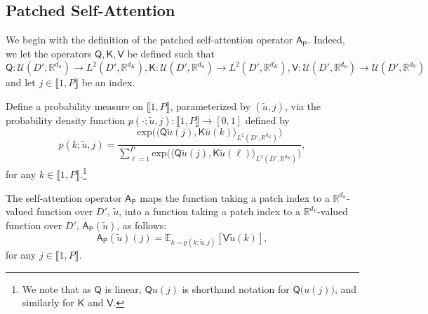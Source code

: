 \documentclass[twoside]{article}
\newcommand{\1}{\mathbbm{1}}
\newcommand{\R}{\mathbbm{R}}
\newcommand{\cU}{\mathcal{U}}
\newcommand{\sAp}{\mathsf{A}_{\mathsf{P}}}
\newcommand{\sQ}{\mathsf{Q}}
\newcommand{\sK}{\mathsf{K}}
\newcommand{\sV}{\mathsf{V}}
\newcommand{\range}[2]{\llbracket #1, #2 \rrbracket}
\providecommand{\mathbbm}{\mathbb} %
\newcommand{\E}{\mathbb{E}}
\begin{document}
\subsection{Patched Self-Attention}
\label{subsec:patch-self-attention}

We begin with the definition of the patched self-attention operator $\sAp$. Indeed, we let the operators $\sQ,\sK,\sV$ be defined such that $\sQ:\cU(D' ,\mathbb{R}^{d_u})\to L^2(D' ,\mathbb{R}^{d_K}), \sK:\cU(D' ,\mathbb{R}^{d_u})\to L^2(D' ,\mathbb{R}^{d_K}), \sV: \cU(D' ,\mathbb{R}^{d_u})\to \cU(D' ,\mathbb{R}^{d_V}) $ and let $j \in \range{1}{P}$ be an index.

\begin{definition}
\label{def:patch_attention_p}
Define a probability measure on $\range{1}{P}$, parameterized by $(\widetilde{u},j)$, via the probability density function $p(\cdot;\widetilde{u},j): \range{1}{P} \to [0,1]$ defined by
\[p(k; \widetilde{u}, j) = \frac{\mathrm{exp} \Big ( \big\langle \sQ \widetilde{u}(j), \sK \widetilde{u}(k) \big\rangle_{L^2(D' ,\mathbb{R}^{d_K})} \Big )}{\sum_{\ell=1}^P \mathrm{exp} \Big ( \big\langle \sQ \widetilde{u}(j), \sK \widetilde{u}(\ell) \big\rangle_{L^2(D' ,\mathbb{R}^{d_K})} \Big )},\]
for any $k \in \range{1}{P}$.\footnote{We note that as $\sQ$ is linear, $\sQ u(j)$ is shorthand notation for $\sQ\bigl(u(j) \bigr)$, and similarly for $\sK$ and $\sV$.}
\end{definition}

\begin{definition}
\label{def:patch_attention}
The self-attention operator $\sAp$ maps the function taking a patch index to a $\R^{d_u}$-valued function over $D'$, $\widetilde{u}$, into a function taking a patch index to a $\R^{d_V}$-valued function over $D'$, $\sAp(\widetilde{u})$, as follows:
\[\sAp(\widetilde{u})(j) = \E_{k \sim p(k;\widetilde{u},j)} [\sV \widetilde{u}(k)],\]
for any $j\in\range{1}{P}$.
\end{definition}
\end{document}
